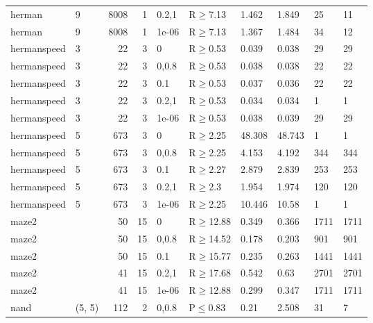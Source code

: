 \begin{longtable}{llrrllllll}
 herman        & 9         &   	8008 &    1 & 0.2,1 & R$\geq$7.13  & 1.462   & 1.849   & 25      & 11   \\
 herman        & 9         &   	8008 &    1 & 1e-06 & R$\geq$7.13  & 1.367   & 1.484   & 34      & 12   \\
 hermanspeed   & 3         &     	22 &    3 & 0     & R$\geq$0.53  & 0.039   & 0.038   & 29      & 29   \\
 hermanspeed   & 3         &     	22 &    3 & 0,0.8 & R$\geq$0.53  & 0.038   & 0.038   & 22      & 22   \\
 hermanspeed   & 3         &     	22 &    3 & 0.1   & R$\geq$0.53  & 0.037   & 0.036   & 22      & 22   \\
 hermanspeed   & 3         &     	22 &    3 & 0.2,1 & R$\geq$0.53  & 0.034   & 0.034   & 1       & 1    \\
 hermanspeed   & 3         &     	22 &    3 & 1e-06 & R$\geq$0.53  & 0.038   & 0.039   & 29      & 29   \\
 hermanspeed   & 5         &    	673 &    3 & 0     & R$\geq$2.25  & 48.308  & 48.743  & 1       & 1    \\
 hermanspeed   & 5         &    	673 &    3 & 0,0.8 & R$\geq$2.25  & 4.153   & 4.192   & 344     & 344  \\
 hermanspeed   & 5         &    	673 &    3 & 0.1   & R$\geq$2.27  & 2.879   & 2.839   & 253     & 253  \\
 hermanspeed   & 5         &    	673 &    3 & 0.2,1 & R$\geq$2.3   & 1.954   & 1.974   & 120     & 120  \\
 hermanspeed   & 5         &    	673 &    3 & 1e-06 & R$\geq$2.25  & 10.446  & 10.58   & 1       & 1    \\
 maze2         &           &     	50 &   15 & 0     & R$\geq$12.88 & 0.349   & 0.366   & 1711    & 1711 \\
 maze2         &           &     	50 &   15 & 0,0.8 & R$\geq$14.52 & 0.178   & 0.203   & 901     & 901  \\
 maze2         &           &     	50 &   15 & 0.1   & R$\geq$15.77 & 0.235   & 0.263   & 1441    & 1441 \\
 maze2         &           &     	41 &   15 & 0.2,1 & R$\geq$17.68 & 0.542   & 0.63    & 2701    & 2701 \\
 maze2         &           &     	41 &   15 & 1e-06 & R$\geq$12.88 & 0.299   & 0.347   & 1711    & 1711 \\
 nand          & (5, 5)    &    	112 &    2 & 0,0.8 & P$\leq$0.83  & 0.21    & 2.508   & 31      & 7    \\

\end{longtable}
